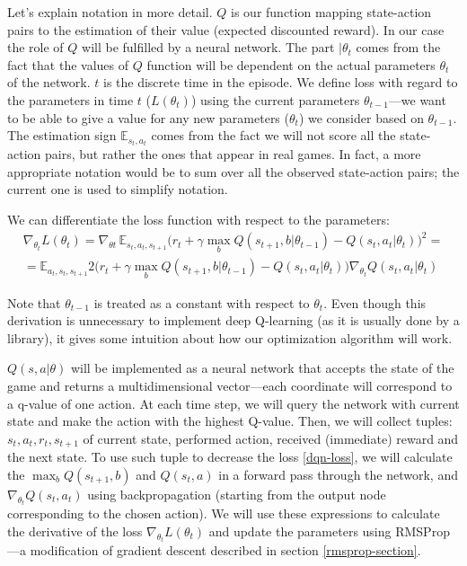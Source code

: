 Let's explain notation in more detail. $Q$ is our function mapping state-action pairs to the estimation of their value (expected discounted reward). In our case the role of $Q$ will be fulfilled by a neural network. The part $|\theta_t$ comes from the fact that the values of $Q$ function will be dependent on the actual parameters $\theta_t$ of the network. $t$ is the discrete time in the episode. We define loss with regard to the parameters in time $t$ ($L(\theta_t)$) using the current parameters $\theta_{t-1}$---we want to be able to give a value for any new parameters ($\theta_t$) we consider based on $\theta_{t-1}$. The estimation sign $\mathbb{E}_{s_t, a_t}$ comes from the fact we will not score all the state-action pairs, but rather the ones that appear in real games. In fact, a more appropriate notation would be to sum over all the observed state-action pairs; the current one is used to simplify notation.

We can differentiate the loss function with respect to the parameters:
\begin{multline}
  \nabla_{\theta_t} L(\theta_t) = \nabla_{\theta t}\, \mathbb{E}_{s_t, a_t, s_{t+1}} \big(r_t + \gamma \max_b Q(s_{t+1}, b|\theta_{t-1}) - Q(s_t, a_t|\theta_t)\big)^2
 =\\=
  \mathbb{E}_{a_t,s_t, s_{t+1}} 2\Big(
  r_t + \gamma \max_b Q(s_{t+1}, b|\theta_{t-1}) - Q(s_t, a_t|\theta_t)\Big)
  \nabla_{\theta_t} Q(s_t, a_t|\theta_t)
\end{multline}

Note that $\theta_{t-1}$ is treated as a constant with respect to $\theta_t$. Even though this derivation is unnecessary to implement deep Q-learning (as it is usually done by a library), it gives some intuition about how our optimization algorithm will work.

$Q(s, a|\theta)$ will be implemented as a neural network that accepts the state of the game and returns a multidimensional vector---each coordinate will correspond to a q-value of one action. At each time step, we will query the network with current state and make the action with the highest Q-value.
Then, we will collect tuples: $s_t, a_t, r_t, s_{t+1}$ of current state, performed action, received (immediate) reward and the next state. To use such tuple to decrease the loss \eqref{dqn-loss}, we will calculate the $\max_b Q(s_{t+1}, b)$ and $Q(s_t, a)$ in a forward pass through the network, and $\nabla_{\theta_t} Q(s_t, a_t)$ using backpropagation (starting from the output node corresponding to the chosen action). We will use these expressions to calculate the derivative of the loss $\nabla_{\theta_t} L(\theta_t)$ and update the parameters using RMSProp---a modification of gradient descent described in section \ref{rmsprop-section}.

